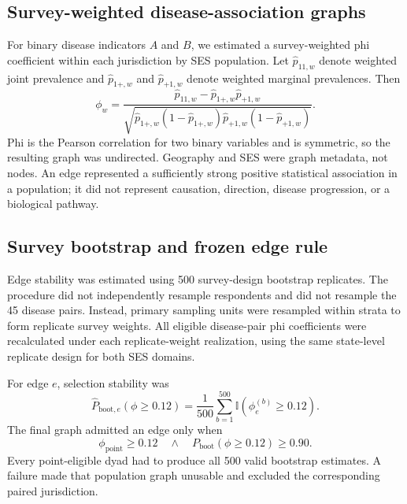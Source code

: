 \documentclass[11pt]{article}
\begin{document}
\subsection{Survey-weighted disease-association graphs}

For binary disease indicators $A$ and $B$, we estimated a survey-weighted phi
coefficient within each jurisdiction by SES population. Let
$\widehat{p}_{11,w}$ denote weighted joint prevalence and
$\widehat{p}_{1+,w}$ and $\widehat{p}_{+1,w}$ denote weighted marginal
prevalences. Then
\begin{equation}
  \phi_w =
  \frac{
    \widehat{p}_{11,w}
    - \widehat{p}_{1+,w}\widehat{p}_{+1,w}
  }{
    \sqrt{
      \widehat{p}_{1+,w}(1-\widehat{p}_{1+,w})
      \widehat{p}_{+1,w}(1-\widehat{p}_{+1,w})
    }
  }.
\end{equation}
Phi is the Pearson correlation for two binary variables and is symmetric, so
the resulting graph was undirected. Geography and SES were graph metadata, not
nodes. An edge represented a sufficiently strong positive statistical
association in a population; it did not represent causation, direction,
disease progression, or a biological pathway.

\subsection{Survey bootstrap and frozen edge rule}

Edge stability was estimated using 500 survey-design bootstrap replicates.
The procedure did not independently resample respondents and did not resample
the 45 disease pairs. Instead, primary sampling units were resampled within
strata to form replicate survey weights. All eligible disease-pair phi
coefficients were recalculated under each replicate-weight realization, using
the same state-level replicate design for both SES domains.

For edge $e$, selection stability was
\begin{equation}
  \widehat{P}_{\mathrm{boot},e}(\phi \ge 0.12)
  =
  \frac{1}{500}
  \sum_{b=1}^{500}
  \mathbb{I}\!\left(\phi_e^{(b)} \ge 0.12\right).
\end{equation}
The final graph admitted an edge only when
\begin{equation}
  \boxed{
    \phi_{\mathrm{point}} \ge 0.12
    \quad\land\quad
    P_{\mathrm{boot}}(\phi \ge 0.12) \ge 0.90
  }.
  \label{eq:stable-edge}
\end{equation}
Every point-eligible dyad had to produce all 500 valid bootstrap estimates.
A failure made that population graph unusable and excluded the corresponding
paired jurisdiction.
\end{document}
